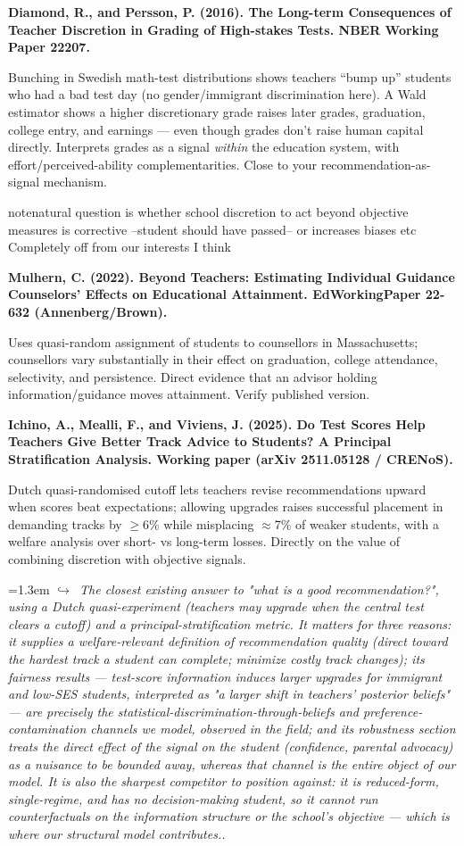 \documentclass[11pt]{article}
\newcommand{\entry}[3]{%
  \par\medskip\noindent\textbf{#1}\par
  \nopagebreak #2\hspace{0.35em}{\small\color{tagcol}[#3]}\par}
\newcommand{\note}[1]{\par\smallskip\noindent\hangindent=1.3em
  \textcolor{notecol}{\footnotesize$\hookrightarrow$~\textit{#1}}}
\begin{document}
\entry{Diamond, R., and Persson, P. (2016). The Long-term Consequences of Teacher
Discretion in Grading of High-stakes Tests. NBER Working Paper 22207.}
{Bunching in Swedish math-test distributions shows teachers ``bump up'' students who
had a bad test day (no gender/immigrant discrimination here). A Wald estimator shows a
higher discretionary grade raises later grades, graduation, college entry, and earnings
--- even though grades don't raise human capital directly. Interprets grades as a signal
\emph{within} the education system, with effort/perceived-ability complementarities.
Close to your recommendation-as-signal mechanism.}{RF}
note{natural question is whether school discretion to act beyond objective measures is corrective --student should have passed-- or increases biases etc Completely off from our interests I think}

\entry{Mulhern, C. (2022). Beyond Teachers: Estimating Individual Guidance
Counselors' Effects on Educational Attainment. EdWorkingPaper 22-632 (Annenberg/Brown).}
{Uses quasi-random assignment of students to counsellors in Massachusetts; counsellors
vary substantially in their effect on graduation, college attendance, selectivity, and
persistence. Direct evidence that an advisor holding information/guidance moves
attainment. Verify published version.}{RF (verify)}

\entry{Ichino, A., Mealli, F., and Viviens, J. (2025). Do Test Scores Help Teachers
Give Better Track Advice to Students? A Principal Stratification Analysis. Working
paper (arXiv 2511.05128 / CRENoS).}
{Dutch quasi-randomised cutoff lets teachers revise recommendations upward when scores
beat expectations; allowing upgrades raises successful placement in demanding tracks by
$\geq$6\% while misplacing $\approx$7\% of weaker students, with a welfare analysis over
short- vs long-term losses. Directly on the value of combining discretion with objective
signals.}{RF}
\note{The closest existing answer to "what is a good recommendation?", using a Dutch quasi-experiment (teachers may upgrade when the central test clears a cutoff) and a principal-stratification metric. It matters for three reasons: it supplies a welfare-relevant definition of recommendation quality (direct toward the hardest track a student can complete; minimize costly track changes); its fairness results — test-score information induces larger upgrades for immigrant and low-SES students, interpreted as "a larger shift in teachers' posterior beliefs" — are precisely the statistical-discrimination-through-beliefs and preference-contamination channels we model, observed in the field; and its robustness section treats the direct effect of the signal on the student (confidence, parental advocacy) as a nuisance to be bounded away, whereas that channel is the entire object of our model. It is also the sharpest competitor to position against: it is reduced-form, single-regime, and has no decision-making student, so it cannot run counterfactuals on the information structure or the school's objective — which is where our structural model contributes..}
\end{document}
